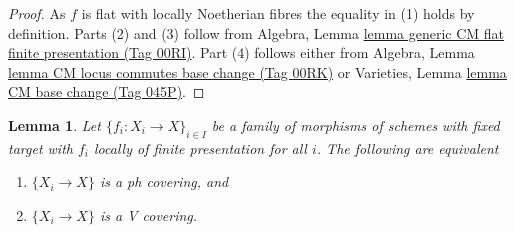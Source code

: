 \documentclass{amsart}
\theoremstyle{plain}
\newtheorem{lemma}[subsection]{Lemma}
\theoremstyle{definition}
\theoremstyle{remark}
\numberwithin{equation}{subsection}
\begin{document}
\begin{proof}
As $f$ is flat with locally Noetherian fibres the equality in (1) holds
by definition. Parts (2) and (3) follow from
Algebra, Lemma \href{https://stacks.math.columbia.edu/tag/00RI}{lemma generic CM flat finite presentation (Tag 00RI)}.
Part (4) follows either from
Algebra, Lemma \href{https://stacks.math.columbia.edu/tag/00RK}{lemma CM locus commutes base change (Tag 00RK)}
or
Varieties, Lemma \href{https://stacks.math.columbia.edu/tag/045P}{lemma CM base change (Tag 045P)}.
\end{proof}


\begin{lemma}
\label{lemma-equivalence-h-v-locally-finite-presentation}
Let $\{f_i : X_i \to X\}_{i \in I}$ be a family of morphisms
of schemes with fixed target with $f_i$ locally of finite
presentation for all $i$. The following are equivalent
\begin{enumerate}
\item $\{X_i \to X\}$ is a ph covering, and
\item $\{X_i \to X\}$ is a V covering.
\end{enumerate}
\end{lemma}
\end{document}

